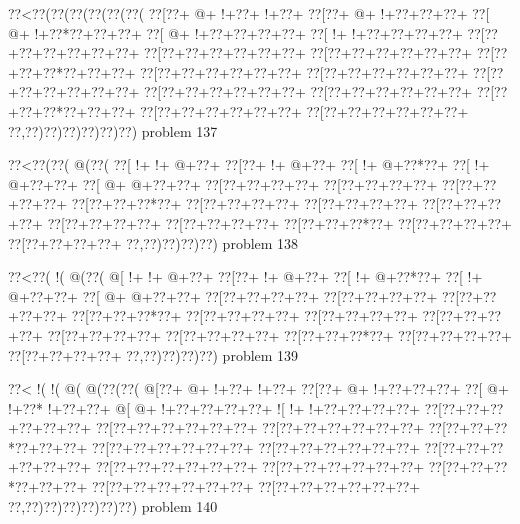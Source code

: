 \vbox{\vbox{\goo
\0??<\0??(\0??(\0??(\0??(\0??(\0??(
\0??[\0??+\- @+\- !+\0??+\- !+\0??+
\0??[\0??+\- @+\- !+\0??+\0??+\0??+
\0??[\- @+\- !+\0??*\0??+\0??+\0??+
\0??[\- @+\- !+\0??+\0??+\0??+\0??+
\0??[\- !+\- !+\0??+\0??+\0??+\0??+
\0??[\0??+\0??+\0??+\0??+\0??+\0??+
\0??[\0??+\0??+\0??+\0??+\0??+\0??+
\0??[\0??+\0??+\0??+\0??+\0??+\0??+
\0??[\0??+\0??+\0??*\0??+\0??+\0??+
\0??[\0??+\0??+\0??+\0??+\0??+\0??+
\0??[\0??+\0??+\0??+\0??+\0??+\0??+
\0??[\0??+\0??+\0??+\0??+\0??+\0??+
\0??[\0??+\0??+\0??+\0??+\0??+\0??+
\0??[\0??+\0??+\0??+\0??+\0??+\0??+
\0??[\0??+\0??+\0??*\0??+\0??+\0??+
\0??[\0??+\0??+\0??+\0??+\0??+\0??+
\0??[\0??+\0??+\0??+\0??+\0??+\0??+
\0??,\0??)\0??)\0??)\0??)\0??)\0??)
}
\hfil problem 137\hfil\break
}

\vbox{\vbox{\goo
\0??<\0??(\0??(\- @(\0??(
\0??[\- !+\- !+\- @+\0??+
\0??[\0??+\- !+\- @+\0??+
\0??[\- !+\- @+\0??*\0??+
\0??[\- !+\- @+\0??+\0??+
\0??[\- @+\- @+\0??+\0??+
\0??[\0??+\0??+\0??+\0??+
\0??[\0??+\0??+\0??+\0??+
\0??[\0??+\0??+\0??+\0??+
\0??[\0??+\0??+\0??*\0??+
\0??[\0??+\0??+\0??+\0??+
\0??[\0??+\0??+\0??+\0??+
\0??[\0??+\0??+\0??+\0??+
\0??[\0??+\0??+\0??+\0??+
\0??[\0??+\0??+\0??+\0??+
\0??[\0??+\0??+\0??*\0??+
\0??[\0??+\0??+\0??+\0??+
\0??[\0??+\0??+\0??+\0??+
\0??,\0??)\0??)\0??)\0??)
}
\hfil problem 138\hfil\break
}

\vbox{\vbox{\goo
\0??<\0??(\- !(\- @(\0??(
\- @[\- !+\- !+\- @+\0??+
\0??[\0??+\- !+\- @+\0??+
\0??[\- !+\- @+\0??*\0??+
\0??[\- !+\- @+\0??+\0??+
\0??[\- @+\- @+\0??+\0??+
\0??[\0??+\0??+\0??+\0??+
\0??[\0??+\0??+\0??+\0??+
\0??[\0??+\0??+\0??+\0??+
\0??[\0??+\0??+\0??*\0??+
\0??[\0??+\0??+\0??+\0??+
\0??[\0??+\0??+\0??+\0??+
\0??[\0??+\0??+\0??+\0??+
\0??[\0??+\0??+\0??+\0??+
\0??[\0??+\0??+\0??+\0??+
\0??[\0??+\0??+\0??*\0??+
\0??[\0??+\0??+\0??+\0??+
\0??[\0??+\0??+\0??+\0??+
\0??,\0??)\0??)\0??)\0??)
}
\hfil problem 139\hfil\break
}

\vbox{\vbox{\goo
\0??<\- !(\- !(\- @(\- @(\0??(\0??(
\- @[\0??+\- @+\- !+\0??+\- !+\0??+
\0??[\0??+\- @+\- !+\0??+\0??+\0??+
\0??[\- @+\- !+\0??*\- !+\0??+\0??+
\- @[\- @+\- !+\0??+\0??+\0??+\0??+
\- ![\- !+\- !+\0??+\0??+\0??+\0??+
\0??[\0??+\0??+\0??+\0??+\0??+\0??+
\0??[\0??+\0??+\0??+\0??+\0??+\0??+
\0??[\0??+\0??+\0??+\0??+\0??+\0??+
\0??[\0??+\0??+\0??*\0??+\0??+\0??+
\0??[\0??+\0??+\0??+\0??+\0??+\0??+
\0??[\0??+\0??+\0??+\0??+\0??+\0??+
\0??[\0??+\0??+\0??+\0??+\0??+\0??+
\0??[\0??+\0??+\0??+\0??+\0??+\0??+
\0??[\0??+\0??+\0??+\0??+\0??+\0??+
\0??[\0??+\0??+\0??*\0??+\0??+\0??+
\0??[\0??+\0??+\0??+\0??+\0??+\0??+
\0??[\0??+\0??+\0??+\0??+\0??+\0??+
\0??,\0??)\0??)\0??)\0??)\0??)\0??)
}
\hfil problem 140\hfil\break
}

